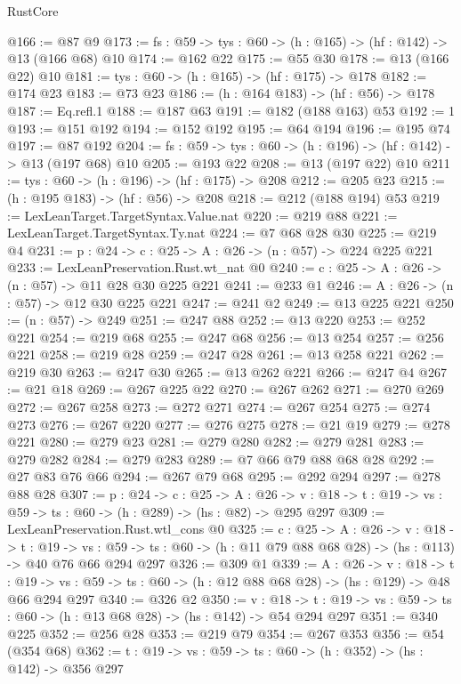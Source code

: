 \begin{lexlean}{RustCore}
\begin{coremodule}
@166 := @87 @9
@173 := {fs : @59} -> {tys : @60} -> (h : @165) -> (hf : @142) -> @13 (@166 @68) @10
@174 := @162 @22
@175 := @55 @30
@178 := @13 (@166 @22) @10
@181 := {tys : @60} -> (h : @165) -> (hf : @175) -> @178
@182 := @174 @23
@183 := @73 @23
@186 := (h : @164 @183) -> (hf : @56) -> @178
@187 := Eq.refl.{1}
@188 := @187 @63
@191 := @182 (@188 @163) @53
@192 := 1
@193 := @151 @192
@194 := @152 @192
@195 := @64 @194
@196 := @195 @74
@197 := @87 @192
@204 := {fs : @59} -> {tys : @60} -> (h : @196) -> (hf : @142) -> @13 (@197 @68) @10
@205 := @193 @22
@208 := @13 (@197 @22) @10
@211 := {tys : @60} -> (h : @196) -> (hf : @175) -> @208
@212 := @205 @23
@215 := (h : @195 @183) -> (hf : @56) -> @208
@218 := @212 (@188 @194) @53
@219 := LexLeanTarget.TargetSyntax.Value.nat
@220 := @219 @88
@221 := LexLeanTarget.TargetSyntax.Ty.nat
@224 := @7 @68 @28 @30
@225 := @219 @4
@231 := {p : @24} -> {c : @25} -> {A : @26} -> (n : @57) -> @224 @225 @221
@233 := LexLeanPreservation.Rust.wt_nat @0
@240 := {c : @25} -> {A : @26} -> (n : @57) -> @11 @28 @30 @225 @221
@241 := @233 @1
@246 := {A : @26} -> (n : @57) -> @12 @30 @225 @221
@247 := @241 @2
@249 := @13 @225 @221
@250 := (n : @57) -> @249
@251 := @247 @88
@252 := @13 @220
@253 := @252 @221
@254 := @219 @68
@255 := @247 @68
@256 := @13 @254
@257 := @256 @221
@258 := @219 @28
@259 := @247 @28
@261 := @13 @258 @221
@262 := @219 @30
@263 := @247 @30
@265 := @13 @262 @221
@266 := @247 @4
@267 := @21 @18
@269 := @267 @225 @22
@270 := @267 @262
@271 := @270 @269
@272 := @267 @258
@273 := @272 @271
@274 := @267 @254
@275 := @274 @273
@276 := @267 @220
@277 := @276 @275
@278 := @21 @19
@279 := @278 @221
@280 := @279 @23
@281 := @279 @280
@282 := @279 @281
@283 := @279 @282
@284 := @279 @283
@289 := @7 @66 @79 @88 @68 @28
@292 := @27 @83 @76 @66
@294 := @267 @79 @68
@295 := @292 @294
@297 := @278 @88 @28
@307 := {p : @24} ->
  {c : @25} ->
  {A : @26} ->
  {v : @18} -> {t : @19} -> {vs : @59} -> {ts : @60} -> (h : @289) -> (hs : @82) -> @295 @297
@309 := LexLeanPreservation.Rust.wtl_cons @0
@325 := {c : @25} ->
  {A : @26} ->
  {v : @18} ->
  {t : @19} ->
  {vs : @59} -> {ts : @60} -> (h : @11 @79 @88 @68 @28) -> (hs : @113) -> @40 @76 @66 @294 @297
@326 := @309 @1
@339 := {A : @26} ->
  {v : @18} ->
  {t : @19} -> {vs : @59} -> {ts : @60} -> (h : @12 @88 @68 @28) -> (hs : @129) -> @48 @66 @294 @297
@340 := @326 @2
@350 := {v : @18} ->
  {t : @19} -> {vs : @59} -> {ts : @60} -> (h : @13 @68 @28) -> (hs : @142) -> @54 @294 @297
@351 := @340 @225
@352 := @256 @28
@353 := @219 @79
@354 := @267 @353
@356 := @54 (@354 @68)
@362 := {t : @19} -> {vs : @59} -> {ts : @60} -> (h : @352) -> (hs : @142) -> @356 @297

\end{coremodule}
\end{lexlean}
